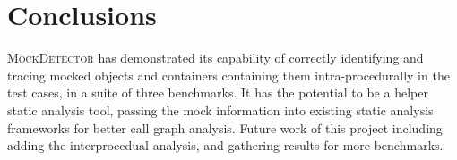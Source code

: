 \section{Conclusions}
\label{sec:conclusion}

\textsc{MockDetector} has demonstrated its capability of correctly identifying and tracing mocked objects and containers containing them intra-procedurally in the test cases, in a suite of three benchmarks. It has the potential to be a helper static analysis tool, passing the mock information into existing static analysis frameworks for better call graph analysis. Future work of this project including adding the interprocedual analysis, and gathering results for more benchmarks. 